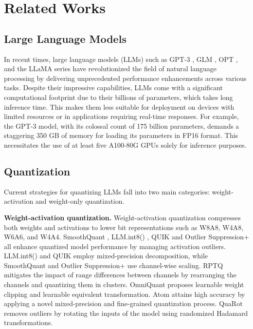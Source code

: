 \section{Related Works}\label{section:sec2}

\subsection{Large Language Models}
In recent times, large language models (LLMs) such as GPT-3 \citep{brown2020language}, GLM \citep{du2021glm}, OPT \citep{zhang2022opt}, and the LLaMA series \cite{touvron2023llama, touvron2023llama2} have revolutionized the field of natural language processing by delivering unprecedented performance enhancements across various tasks. Despite their impressive capabilities, LLMs come with a significant computational footprint due to their billions of parameters, which takes long inference time. This makes them less suitable for deployment on devices with limited resources or in applications requiring real-time responses. For example, the GPT-3 \citep{brown2020language} model, with its colossal count of 175 billion parameters, demands a staggering 350 GB of memory for loading its parameters in FP16 format. This necessitates the use of at least five A100-80G GPUs solely for inference purposes.
\subsection{Quantization}
Current strategies for quantizing LLMs fall into two main categories: weight-activation and weight-only quantization.

\textbf{Weight-activation quantization.} Weight-activation quantization compresses both weights and activations to lower bit representations such as W8A8, W4A8, W6A6, and W4A4. SmoothQuant \citep{xiao2023smoothquant}, LLM.int8() \citep{dettmers2208llm}, QUIK \citep{ashkboos2023towards} and Outlier Suppression+ \citep{wei2023outlier} all enhance quantized model performance by managing activation outliers. LLM.int8() \citep{dettmers2208llm} and QUIK \citep{ashkboos2023towards} employ mixed-precision decomposition, while SmoothQuant \citep{xiao2023smoothquant} and Outlier Suppression+ \citep{wei2023outlier} use channel-wise scaling. RPTQ \citep{yuan2023rptq} mitigates the impact of range differences between channels by rearranging the channels and quantizing them in clusters. OmniQuant \citep{shao2023omniquant} proposes learnable weight clipping and learnable equivalent transformation. Atom \citep{zhao2023atom} attains high accuracy by applying a novel mixed-precision and fine-grained quantization process.  QuaRot \citep{ashkboos2024quarot} removes outliers by rotating the inputs of the model using randomized Hadamard transformations.

